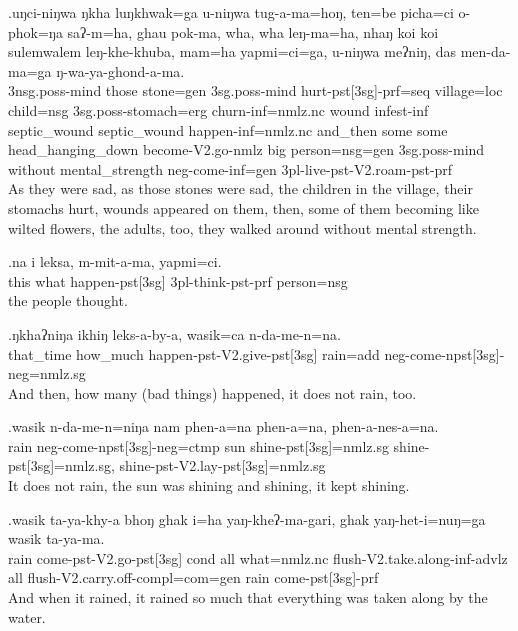 \exg.uŋci-niŋwa ŋkha luŋkhwak=ga  u-niŋwa  tug-a-ma=hoŋ, ten=be  picha=ci  o-phok=ŋa   saʔ-m=ha,  ghau  pok-ma, wha, wha  leŋ-ma=ha,   nhaŋ  koi  koi  sulemwalem  leŋ-khe-khuba, mam=ha yapmi=ci=ga,  u-niŋwa  meʔniŋ, das   men-da-ma=ga   ŋ-wa-ya-ghond-a-ma.\\
{\sc 3nsg.poss-}mind those stone{\sc =gen} {\sc 3sg.poss-}mind hurt{\sc -pst[3sg]-prf=seq} village{\sc =loc} child{\sc =nsg} {\sc 3sg.poss-}stomach{\sc =erg} churn{\sc -inf=nmlz.nc} wound infest{\sc -inf} septic\_wound septic\_wound happen{\sc -inf=nmlz.nc} and\_then some some head\_hanging\_down become{\sc -V2.go-nmlz} big person{\sc =nsg=gen} {\sc 3sg.poss-}mind without mental\_strength {\sc neg-}come{\sc -inf=gen} {\sc 3pl-}live{\sc -pst-V2.roam-pst-prf}\\
As they were sad, as those stones were sad, the children in the village, their stomachs hurt, wounds appeared on them, then, some of them becoming like wilted flowers, the adults, too, they walked around without mental strength.


\exg.na i  leksa,  m-mit-a-ma,  yapmi=ci.\\
this what happen{\sc -pst[3sg]} {\sc 3pl-}think{\sc -pst-prf} person{\sc =nsg}\\
 the people thought.

\exg.ŋkhaʔniŋa ikhiŋ leks-a-by-a,   wasik=ca  n-da-me-n=na.\\
that\_time  how\_much happen{\sc -pst-V2.give-pst[3sg]} rain{\sc =add} {\sc neg-}come{\sc -npst[3sg]-neg=nmlz.sg}\\
And then, how many (bad things) happened, it does not rain, too.

\exg.wasik n-da-me-n=niŋa    nam phen-a=na    phen-a=na,    phen-a-nes-a=na.\\
rain  {\sc neg-}come{\sc -npst[3sg]-neg=ctmp} sun shine{\sc -pst[3sg]=nmlz.sg} shine{\sc -pst[3sg]=nmlz.sg}, shine{\sc -pst-V2.lay-pst[3sg]=nmlz.sg}\\
It does not rain, the sun was shining and shining, it kept shining.

\exg.wasik ta-ya-khy-a   bhoŋ ghak i=ha  yaŋ-kheʔ-ma-gari,  ghak yaŋ-het-i=nuŋ=ga    wasik ta-ya-ma.\\
rain  come{\sc -pst-V2.go-pst[3sg]} {\sc cond}  all  what{\sc =nmlz.nc} flush{\sc -V2.take.along-inf-advlz} all  flush{\sc -V2.carry.off-compl=com=gen} rain  come{\sc -pst[3sg]-prf}\\
And when it rained, it rained so much that everything was taken along by the water.

